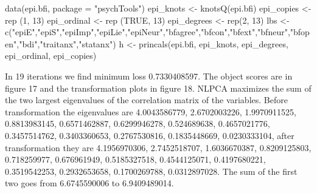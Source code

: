 \documentclass[
  12pt,
  letterpaper,
  DIV=11,
  numbers=noendperiod]{scrreprt}
\newenvironment{Shaded}{\begin{snugshade}}{\end{snugshade}}
\newcommand{\AttributeTok}[1]{\textcolor[rgb]{0.40,0.45,0.13}{#1}}
\newcommand{\ConstantTok}[1]{\textcolor[rgb]{0.56,0.35,0.01}{#1}}
\newcommand{\DecValTok}[1]{\textcolor[rgb]{0.68,0.00,0.00}{#1}}
\newcommand{\FunctionTok}[1]{\textcolor[rgb]{0.28,0.35,0.67}{#1}}
\newcommand{\NormalTok}[1]{\textcolor[rgb]{0.00,0.23,0.31}{#1}}
\newcommand{\OtherTok}[1]{\textcolor[rgb]{0.00,0.23,0.31}{#1}}
\newcommand{\SpecialCharTok}[1]{\textcolor[rgb]{0.37,0.37,0.37}{#1}}
\newcommand{\StringTok}[1]{\textcolor[rgb]{0.13,0.47,0.30}{#1}}
\begin{document}
\begin{Shaded}
\begin{Highlighting}[]
\FunctionTok{data}\NormalTok{(epi.bfi, }\AttributeTok{package =} \StringTok{"psychTools"}\NormalTok{)}
\NormalTok{epi\_knots }\OtherTok{\textless{}{-}} \FunctionTok{knotsQ}\NormalTok{(epi.bfi)}
\NormalTok{epi\_copies }\OtherTok{\textless{}{-}} \FunctionTok{rep}\NormalTok{ (}\DecValTok{1}\NormalTok{, }\DecValTok{13}\NormalTok{)}
\NormalTok{epi\_ordinal }\OtherTok{\textless{}{-}} \FunctionTok{rep}\NormalTok{ (}\ConstantTok{TRUE}\NormalTok{, }\DecValTok{13}\NormalTok{)}
\NormalTok{epi\_degrees }\OtherTok{\textless{}{-}} \FunctionTok{rep}\NormalTok{(}\DecValTok{2}\NormalTok{, }\DecValTok{13}\NormalTok{)}
\NormalTok{lbs }\OtherTok{\textless{}{-}} \FunctionTok{c}\NormalTok{(}\StringTok{"epiE"}\NormalTok{,}\StringTok{"epiS"}\NormalTok{,}\StringTok{"epiImp"}\NormalTok{,}\StringTok{"epiLie"}\NormalTok{,}\StringTok{"epiNeur"}\NormalTok{,}\StringTok{"bfagree"}\NormalTok{,}\StringTok{"bfcon"}\NormalTok{,}\StringTok{"bfext"}\NormalTok{,}\StringTok{"bfneur"}\NormalTok{,}\StringTok{"bfopen"}\NormalTok{,}\StringTok{"bdi"}\NormalTok{,}\StringTok{"traitanx"}\NormalTok{,}\StringTok{"statanx"}\NormalTok{)}
\NormalTok{h }\OtherTok{\textless{}{-}} \FunctionTok{princals}\NormalTok{(epi.bfi, epi\_knots, epi\_degrees, epi\_ordinal, epi\_copies)}
\end{Highlighting}
\end{Shaded}

In 19 iterations we find minimum loss 0.7330408597. The object scores
are in figure 17 and the transformation plots in figure 18. NLPCA
maximizes the sum of the two largest eigenvalues of the correlation
matrix of the variables. Before transformation the eigenvalues are
4.0043586779, 2.6702003226, 1.9970911525, 0.8813983145, 0.6571462887,
0.6299946278, 0.524689638, 0.4657021776, 0.3457514762, 0.3403360653,
0.2767530816, 0.1835448669, 0.0230333104, after transformation they are
4.1956970306, 2.7452518707, 1.6036670387, 0.8209125803, 0.718259977,
0.676961949, 0.5185327518, 0.4544125071, 0.4197680221, 0.3519542253,
0.2932653658, 0.1700269788, 0.0312897028. The sum of the first two goes
from 6.6745590006 to 6.9409489014.

\begin{Shaded}
\end{Shaded}
\end{document}
